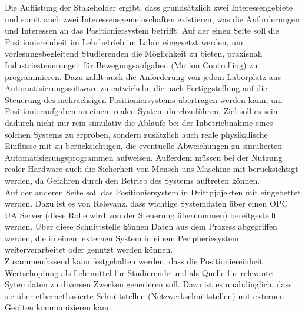 \documentclass[../../../Bachelorarbeit.tex]{subfiles}
\begin{document}
Die Auflistung der Stakeholder ergibt, dass grundsätzlich zwei Interessengebiete und somit auch zwei Interessensgemeinschaften existieren, was die Anforderungen und Interessen an das Positioniersystem betrifft. Auf der einen Seite soll die Positioniereinheit im Lehrbetrieb im Labor eingesetzt werden, um vorlesungsbegleitend Studierenden die Möglichkeit zu bieten, praxisnah Industriesteuerungen für Bewegungsaufgaben (Motion Controlling) zu programmieren. Dazu zählt auch die Anforderung von jedem Laborplatz aus Automatisierungssoftware zu entwickeln, die nach Fertiggstellung auf die Steuerung des mehrachsigen Positioniersystems übertragen werden kann, um Positionieraufgaben an einem realen System durchzuführen. Ziel soll es sein dadurch nicht nur rein simulativ die Abläufe bei der Inbetriebnahme eines solchen Systems zu erproben, sondern zusätzlich auch reale physikalische Einflüsse mit zu berücksichtigen, die eventuelle Abweichungen zu simulierten Automatisierungsprogrammen aufweisen. Außerdem müssen bei der Nutzung realer Hardware auch die Sicherheit von Mensch uns Maschine mit berücksichtigt werden, da Gefahren durch den Betrieb des Systems auftreten können.\\
Auf der anderen Seite soll das Positioniersystem in Drittpjojekten mit eingebettet werden. Dazu ist es von Relevanz, dass wichtige Systemdaten über einen OPC UA Server (diese Rolle wird von der Steuerung übernommen) bereitgestellt werden. Über diese Schnittstelle können Daten aus dem Prozess abgegriffen werden, die in einem externen System \bzw in einem Peripheriesystem weiterverarbeitet oder genutzt werden können.\\
Zusammenfassend kann festgehalten werden, dass die Positioniereinheit Wertschöpfung als Lehrmittel für Studierende und als Quelle für relevante Sytemdaten zu diversen Zwecken generieren soll. Dazu ist es unabdinglich, dass sie über ethernetbasierte Schnittstellen (Netzwerkschnittstellen) mit externen Geräten kommunizieren kann. 
\end{document}
